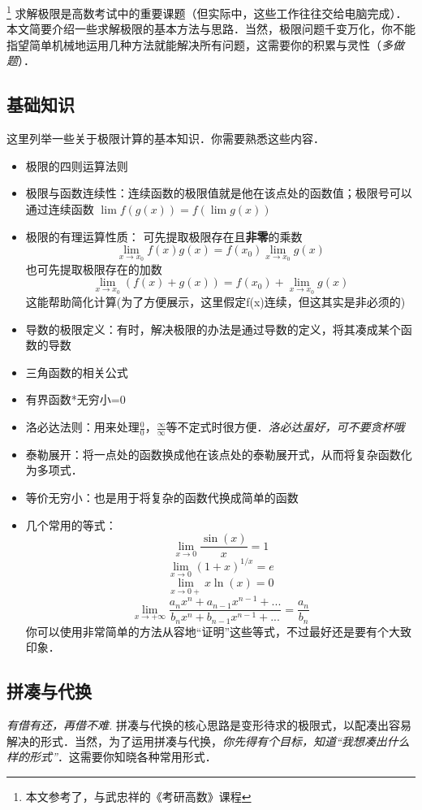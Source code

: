 
\begin{issues}
\issueDraft
\end{issues}
\footnote{本文参考了\cite{同济高}，\cite{Thomas}与武忠祥的《考研高数》课程}
求解极限是高数考试中的重要课题（但实际中，这些工作往往交给电脑完成）．本文简要介绍一些求解极限的基本方法与思路．当然，极限问题千变万化，你不能指望简单机械地运用几种方法就能解决所有问题，这需要你的积累与灵性（\textsl{多做题}）．

\subsection{基础知识}
这里列举一些关于极限计算的基本知识．你需要熟悉这些内容．
\begin{itemize}
\item 极限的四则运算法则
\item 极限与函数连续性：连续函数的极限值就是他在该点处的函数值；极限号可以通过连续函数 $\lim f(g(x)) = f(\lim g(x))$
\item 极限的有理运算性质：
可先提取极限存在且\textbf{非零}的乘数 
$$\lim_{x\to x_0} f(x)g(x) = f(x_0)\lim_{x\to x_0} g(x)$$
也可先提取极限存在的加数
$$\lim_{x\to x_0} (f(x)+g(x)) = f(x_0)+\lim_{x\to x_0} g(x)$$
这能帮助简化计算(为了方便展示，这里假定f(x)连续，但这其实是非必须的)
\item 导数的极限定义：有时，解决极限的办法是通过导数的定义，将其凑成某个函数的导数
\item 三角函数的相关公式
\item 有界函数*无穷小=0
\item 洛必达法则：用来处理$\frac{0}{0}$，$\frac{\infty}{\infty}$等不定式时很方便．\textsl{洛必达虽好，可不要贪杯哦}
\item 泰勒展开：将一点处的函数换成他在该点处的泰勒展开式，从而将复杂函数化为多项式．
\item 等价无穷小：也是用于将复杂的函数代换成简单的函数
\item 几个常用的等式：
$$\lim_{x\to0} \frac{\sin(x)}{x}=1$$
$$\lim_{x\to0} (1+x)^{1/x}=e$$
$$\lim_{x\to0+} x\ln(x)=0$$
$$\lim_{x\to+\infty} \frac{a_nx^n+a_{n-1}x^{n-1}+...}{b_nx^n+b_{n-1}x^{n-1}+...}=\frac{a_n}{b_n}$$
你可以使用非常简单的方法从容地“证明”这些等式，不过最好还是要有个大致印象．
\end{itemize}

\subsection{拼凑与代换}
\textsl{有借有还，再借不难.} 拼凑与代换的核心思路是变形待求的极限式，以配凑出容易解决的形式．当然，为了运用拼凑与代换，\textsl{你先得有个目标，知道“我想凑出什么样的形式”}．这需要你知晓各种常用形式．


